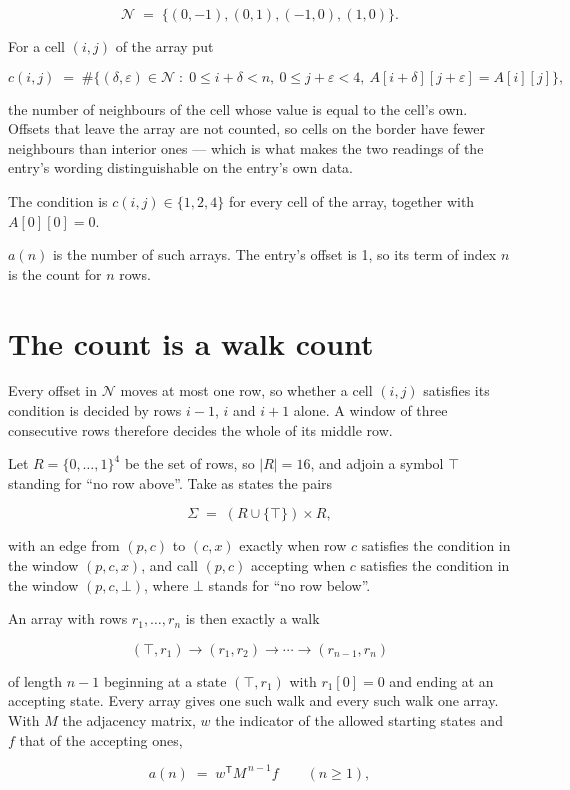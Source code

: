\documentclass[11pt]{article}
\theoremstyle{definition}
\begin{document}
\[\mathcal{N} \;=\; \{(0,-1), (0,1), (-1,0), (1,0)\}.\]

For a cell $(i,j)$ of the array put

\[c(i,j) \;=\; \#\bigl\{(\delta,\varepsilon)\in\mathcal{N} \;:\; 0\le i+\delta<n,\ 0\le j+\varepsilon<4,\ A[i+\delta][j+\varepsilon] = A[i][j]\bigr\},\]

the number of neighbours of the cell whose value is equal to the cell's own. Offsets that leave the array are not counted, so cells on the border have fewer neighbours than interior ones --- which is what makes the two readings of the entry's wording distinguishable on the entry's own data.

The condition is $c(i,j) \in \{1, 2, 4\}$ for every cell of the array, together with $A[0][0]=0$.

$a(n)$ is the number of such arrays. The entry's offset is 1, so its term of index $n$ is the count for $n$ rows.

\section{The count is a walk count}

Every offset in $\mathcal{N}$ moves at most one row, so whether a cell $(i,j)$ satisfies its condition is decided by rows $i-1$, $i$ and $i+1$ alone. A window of three consecutive rows therefore decides the whole of its middle row.

Let $R = \{0,\dots,1\}^{4}$ be the set of rows, so $|R| = 16$, and adjoin a symbol $\top$ standing for ``no row above''. Take as states the pairs

\[\Sigma \;=\; (R \cup \{\top\}) \times R,\]

with an edge from $(p,c)$ to $(c,x)$ exactly when row $c$ satisfies the condition in the window $(p,c,x)$, and call $(p,c)$ accepting when $c$ satisfies the condition in the window $(p,c,\bot)$, where $\bot$ stands for ``no row below''.

An array with rows $r_1,\dots,r_n$ is then exactly a walk

\[(\top,r_1) \to (r_1,r_2) \to \cdots \to (r_{n-1},r_n)\]

of length $n-1$ beginning at a state $(\top,r_1)$ with $r_1[0]=0$ and ending at an accepting state. Every array gives one such walk and every such walk one array. With $M$ the adjacency matrix, $w$ the indicator of the allowed starting states and $f$ that of the accepting ones,

\[a(n) \;=\; w^{\mathsf T} M^{\,n-1} f \qquad (n \ge 1),\]
\end{document}
